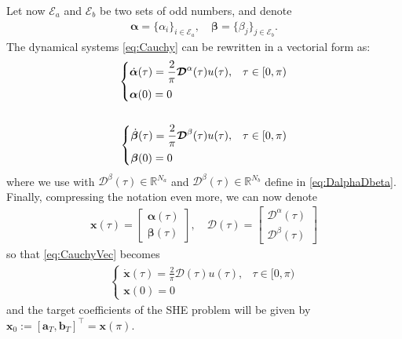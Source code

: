Let now $\mathcal{E}_a$ and $\mathcal{E}_b$ be two sets of odd numbers, and denote
\begin{align*}
	\bm{\alpha} = \{\alpha_i\}_{i\in\mathcal{E}_a}, \quad \bm{\beta} = \{\beta_j\}_{j\in\mathcal{E}_b}.
\end{align*}
The dynamical systems \eqref{eq:Cauchy} can be rewritten in a vectorial form as:
\begin{align}\label{eq:CauchyVec}
	\begin{cases}
		\displaystyle \dot{\bm{\alpha}}(\tau) = \frac 2\pi \bm{\mathcal{D}}^\alpha(\tau) u(\tau), & \tau \in [0,\pi)
		\\[6pt]
		\bm{\alpha}(0) = 0
	\end{cases} \notag
	\\
	\\
	\begin{cases}
		\displaystyle\dot{\bm{\beta}}(\tau)  = \frac 2\pi \bm{\mathcal{D}}^\beta(\tau) u(\tau), & \tau \in [0,\pi) 
		\\[6pt]
		\bm{\beta}(0) = 0
	\end{cases}\notag 
\end{align}
where we use with $\bm{\mathcal{D}}^\beta(\tau) \in \mathbb{R}^{N_a} $ and $ \bm{\mathcal{D}}^\beta(\tau) \in \mathbb{R}^{N_b}$ define in \eqref{eq:DalphaDbeta}. 
Finally, compressing the notation even more, we can now denote 
\begin{align*}
	\bm{x}(\tau) = \begin{bmatrix} \bm{\alpha}(\tau) \\ \bm{\beta}(\tau) \end{bmatrix}, \quad
	\bm{\mathcal{D}}(\tau) = \begin{bmatrix} \bm{\mathcal{D}}^\alpha(\tau) \\ \bm{\mathcal{D}}^\beta(\tau) \end{bmatrix}     
\end{align*}
so that \eqref{eq:CauchyVec} becomes
\begin{align}\label{eq:CauchyCompact}
	\begin{cases}
		\displaystyle\dot{\bm{x}}(\tau) = \frac 2\pi\bm{\mathcal{D}}(\tau) u(\tau),  & \tau \in [0,\pi)
		\\[6pt]
		\bm{x}(0) = {0}
	\end{cases}
\end{align}
and the target coefficients of the SHE problem will be given by $\bm{x}_0:=[\bm{a}_T,\bm{b}_T]^\top=\bm{x}(\pi)$.


